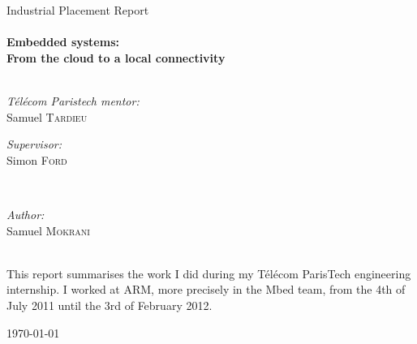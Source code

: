 \begin{titlepage}
\begin{center}
\LARGE Industrial Placement Report\\[0.5cm]
\HRule \\
{ \huge \bfseries Embedded systems: \\ From the cloud to a local connectivity}\\

\HRule \\[1cm]

\begin{minipage}{0.4\textwidth}
\begin{flushleft} \large
\emph{T\'{e}l\'{e}com Paristech mentor:}\\
Samuel \textsc{Tardieu}
\end{flushleft}
\end{minipage}
\begin{minipage}{0.4\textwidth}
\begin{flushright} \large
\emph{Supervisor:} \\
Simon \textsc{Ford}
\end{flushright}
\end{minipage}\\[1.0cm]


\begin{minipage}{0.4\textwidth}
\begin{center} \large
\emph{Author:} \\
Samuel \textsc{Mokrani}
\end{center}
\end{minipage}\\[3.0cm]

\large This report summarises the work I did during my T\'{e}l\'{e}com ParisTech engineering internship. I worked at ARM, more precisely in the Mbed team, from the 4th of July 2011 until the 3rd of February 2012.



\vfill

{\large \today}

\end{center}

\end{titlepage}